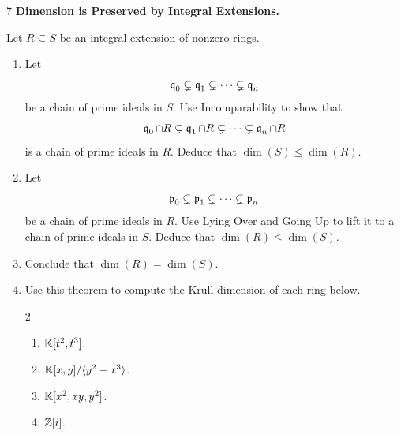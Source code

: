 \documentclass[Notebook.tex]{subfiles}
\begin{document}
\newpage 

\begin{problem}{7}
    \textbf{Dimension is Preserved by Integral Extensions.} 
    
    Let $R\subseteq S$ be an integral extension of nonzero rings.
    \begin{enumerate}
        \item Let
        \[
        \operatorname{\mathfrak{q}}_0\subsetneq \operatorname{\mathfrak{q}}_1\subsetneq\cdots\subsetneq \operatorname{\mathfrak{q}}_n
        \]
        be a chain of prime ideals in $S$. Use Incomparability to show that
        \[
        \operatorname{\mathfrak{q}}_0\cap R\subsetneq \operatorname{\mathfrak{q}}_1\cap R\subsetneq\cdots\subsetneq \operatorname{\mathfrak{q}}_n\cap R
        \]
        is a chain of prime ideals in $R$. Deduce that $\dim(S)\leq \dim(R)$.
        \item Let
        \[
        \operatorname{\mathfrak{p}}_0\subsetneq \operatorname{\mathfrak{p}}_1\subsetneq\cdots\subsetneq \operatorname{\mathfrak{p}}_n
        \]
        be a chain of prime ideals in $R$. Use Lying Over and Going Up to lift it to a chain of prime ideals in $S$. Deduce that $\dim(R)\leq \dim(S)$.
        \item Conclude that $\dim(R)=\dim(S)$.
        \item Use this theorem to compute the Krull dimension of each ring below.
        \begin{multicols}{2}
        \begin{enumerate}
            \item $\mathbb K[t^2,t^3]$.
            \item $\mathbb K[x,y]/\langle y^2-x^3\rangle$.
            \item $\mathbb K[x^2,xy,y^2]$.
            \item $\mathbb Z[i]$.
        \end{enumerate}
        \end{multicols}
    \end{enumerate}
\end{problem}
\end{document}
